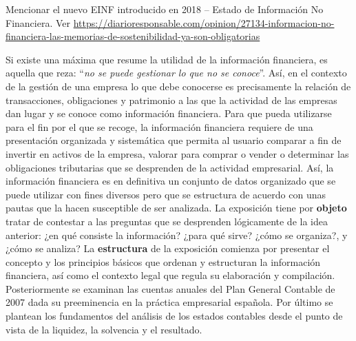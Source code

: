 \documentclass{nuevotema}
\begin{document}
\ideaclave

Mencionar el nuevo EINF introducido en 2018 -- Estado de Información No Financiera. Ver \url{https://diarioresponsable.com/opinion/27134-informacion-no-financiera-las-memorias-de-sostenibilidad-ya-son-obligatorias}

Si existe una máxima que resume la utilidad de la información financiera, es aquella que reza: ``\textit{no se puede gestionar lo que no se conoce}''. Así, en el contexto de la gestión de una empresa lo que debe conocerse es precisamente la relación de transacciones, obligaciones y patrimonio a las que la actividad de las empresas dan lugar y se conoce como información financiera. Para que pueda utilizarse para el fin por el que se recoge, la información financiera requiere de una presentación organizada y sistemática que permita al usuario comparar a fin de invertir en activos de la empresa, valorar para comprar o vender o determinar las obligaciones tributarias que se desprenden de la actividad empresarial. Así, la información financiera es en definitiva un conjunto de datos organizado que se puede utilizar con fines diversos pero que se estructura de acuerdo con unas pautas que la hacen susceptible de ser analizada. La exposición tiene por \textbf{objeto} tratar de contestar a las preguntas que se desprenden lógicamente de la idea anterior: ¿en qué consiste la información? ¿para qué sirve? ¿cómo se organiza?, y ¿cómo se analiza? La \textbf{estructura} de la exposición comienza por  presentar el concepto y los principios básicos que ordenan y estructuran la información financiera, así como el contexto legal que regula su elaboración y compilación. Posteriormente se examinan las cuentas anuales del Plan General Contable de 2007 dada su preeminencia en la práctica empresarial española. Por último se plantean los fundamentos del análisis de los estados contables desde el punto de vista de la liquidez, la solvencia y el resultado.
\end{document}
